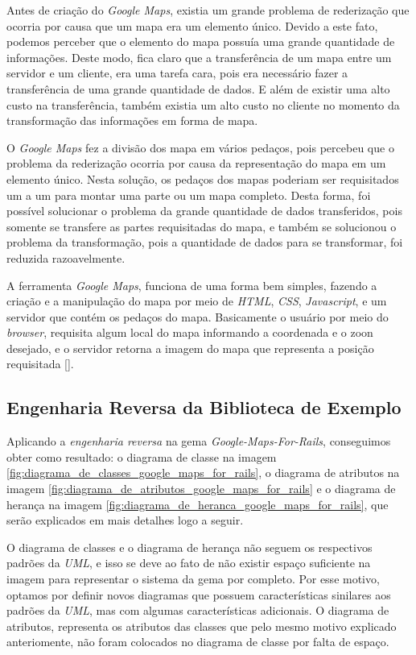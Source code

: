 Antes de criação do \emph{Google Maps}, existia um grande problema de rederização que ocorria por causa
que um mapa era um elemento único. Devido a este fato, podemos perceber que o elemento do mapa
possuía uma grande quantidade de informações. Deste modo, fica claro que a transferência de um mapa entre
um servidor e um cliente, era uma tarefa cara, pois era necessário fazer a transferência de uma grande
quantidade de dados. E além de existir uma alto custo na transferência, também existia um alto custo no
cliente no momento da transformação das informações em forma de mapa.

O \emph{Google Maps} fez a divisão dos mapa em vários pedaços, pois percebeu que o problema da rederização 
ocorria por causa da representação do mapa em um elemento único. Nesta solução, os pedaços dos mapas
poderiam ser requisitados um a um para montar uma parte ou um mapa completo. Desta forma, foi possível
solucionar o problema da grande quantidade de dados transferidos, pois somente se transfere as partes
requisitadas do mapa, e também se solucionou o problema da transformação, pois a quantidade de dados
para se transformar, foi reduzida razoavelmente.

A ferramenta \emph{Google Maps}, funciona de uma forma bem simples, fazendo a criação e a manipulação do
mapa por meio de \emph{HTML}, \emph{CSS}, \emph{Javascript}, e um servidor que contém os pedaços do mapa.
Basicamente o usuário por meio do \emph{browser}, requisita algum local do mapa informando a coordenada
e o zoon desejado, e o servidor retorna a imagem do mapa que representa a posição requisitada
[]. 


\subsection{Engenharia Reversa da Biblioteca de Exemplo}
\label{subsection:engenharia_reversa_da_biblioteca_de_exemplo}


Aplicando a \emph{engenharia reversa} na gema \emph{Google-Maps-For-Rails}, conseguimos obter como resultado:
o diagrama de classe na imagem \ref{fig:diagrama_de_classes_google_maps_for_rails}, o diagrama de
atributos na imagem \ref{fig:diagrama_de_atributos_google_maps_for_rails} e o diagrama de herança na
imagem \ref{fig:diagrama_de_heranca_google_maps_for_rails}, que serão explicados em mais detalhes logo a
seguir.

O diagrama de classes e o diagrama de herança não seguem os respectivos padrões da \emph{UML}, e isso se
deve ao fato de não existir espaço suficiente na imagem para representar o sistema da gema por completo.
Por esse motivo, optamos por definir novos diagramas que possuem características sinilares aos padrões
da \emph{UML}, mas com algumas características adicionais. O diagrama de atributos, representa os atributos
das classes que pelo mesmo motivo explicado anteriomente, não foram colocados no diagrama de classe por
falta de espaço.


